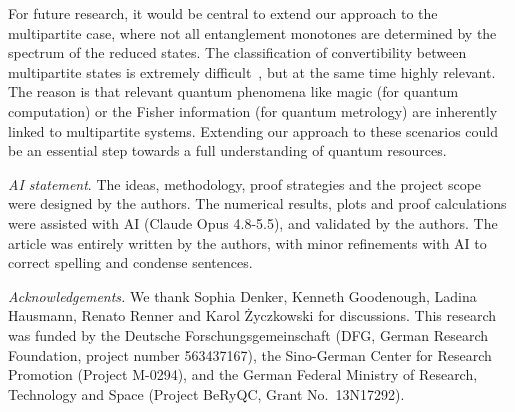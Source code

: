 \documentclass[aps,pra,twocolumn,superscriptaddress]{revtex4-2}
\begin{document}
For future research, it would be central to extend our approach to the multipartite case, where not all entanglement monotones are determined by the spectrum of the
reduced states. The classification of convertibility between multipartite states
is extremely difficult~\cite{Sauerwein_2018}, but at the same time highly relevant.
The reason is that relevant quantum phenomena like magic (for quantum computation) or the Fisher information (for quantum metrology) are inherently linked to multipartite systems. Extending our approach to these scenarios could be an essential step towards a full understanding of quantum resources.

\bigskip

{\em AI statement}.
The ideas, methodology,
proof strategies and the project scope
were designed by the authors.
The numerical results, plots and proof calculations were assisted with AI (Claude Opus 4.8-5.5), and validated by the authors. The article was entirely written by the authors, with minor refinements with AI to correct spelling and condense sentences.

{\em Acknowledgements.} We thank Sophia Denker, Kenneth Goodenough, Ladina Hausmann, Renato
Renner and Karol \.Zyczkowski for discussions.
This research was funded by the Deutsche Forschungsgemeinschaft (DFG, German Research Foundation, project number 563437167), the Sino-German Center for Research Promotion (Project M-0294), and the German Federal Ministry of Research, Technology and Space (Project BeRyQC, Grant No.\ 13N17292).

\newpage



\end{document}
